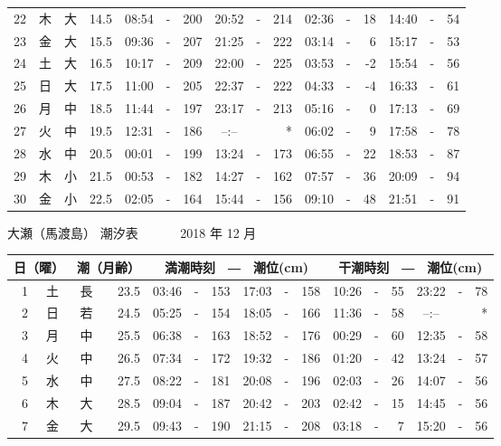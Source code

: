 \documentclass[12pt.a4j]{jsarticle}
\begin{document}
\begin{center}
\begin{table}[ht]
\begin{tabular}{|rc|cr|ccrccr|ccrccr|}
22 & 木 & 大 & 14.5 & 08:54 &-& 200 & 20:52 &-& 214 & 02:36 &-&  18 & 14:40 &-&  54 \\
23 & 金 & 大 & 15.5 & 09:36 &-& 207 & 21:25 &-& 222 & 03:14 &-&   6 & 15:17 &-&  53 \\
24 & 土 & 大 & 16.5 & 10:17 &-& 209 & 22:00 &-& 225 & 03:53 &-&  -2 & 15:54 &-&  56 \\
25 & 日 & 大 & 17.5 & 11:00 &-& 205 & 22:37 &-& 222 & 04:33 &-&  -4 & 16:33 &-&  61 \\
26 & 月 & 中 & 18.5 & 11:44 &-& 197 & 23:17 &-& 213 & 05:16 &-&   0 & 17:13 &-&  69 \\
27 & 火 & 中 & 19.5 & 12:31 &-& 186 & --:-- & &  *  & 06:02 &-&   9 & 17:58 &-&  78 \\
28 & 水 & 中 & 20.5 & 00:01 &-& 199 & 13:24 &-& 173 & 06:55 &-&  22 & 18:53 &-&  87 \\
29 & 木 & 小 & 21.5 & 00:53 &-& 182 & 14:27 &-& 162 & 07:57 &-&  36 & 20:09 &-&  94 \\
30 & 金 & 小 & 22.5 & 02:05 &-& 164 & 15:44 &-& 156 & 09:10 &-&  48 & 21:51 &-&  91 \\
\hline
\end{tabular}
\end{table}
\newpage
{\LARGE 大瀬（馬渡島）  潮汐表　　　}
{\large 2018 年 12 月}\\
\begin{table}[ht]
\begin{tabular}{|rc|cr|ccrccr|ccrccr|}
\hline
\multicolumn{2}{|c|}{日（曜）} & \multicolumn{2}{c|}{潮（月齢）} & \multicolumn{6}{c|}{満潮時刻　―　潮位(cm)} & \multicolumn{6}{c|}{干潮時刻　―　潮位(cm)} \\
\hline
 1 & 土 & 長 & 23.5 & 03:46 &-& 153 & 17:03 &-& 158 & 10:26 &-&  55 & 23:22 &-&  78 \\
 2 & 日 & 若 & 24.5 & 05:25 &-& 154 & 18:05 &-& 166 & 11:36 &-&  58 & --:-- & &  *  \\
 3 & 月 & 中 & 25.5 & 06:38 &-& 163 & 18:52 &-& 176 & 00:29 &-&  60 & 12:35 &-&  58 \\
 4 & 火 & 中 & 26.5 & 07:34 &-& 172 & 19:32 &-& 186 & 01:20 &-&  42 & 13:24 &-&  57 \\
 5 & 水 & 中 & 27.5 & 08:22 &-& 181 & 20:08 &-& 196 & 02:03 &-&  26 & 14:07 &-&  56 \\
 6 & 木 & 大 & 28.5 & 09:04 &-& 187 & 20:42 &-& 203 & 02:42 &-&  15 & 14:45 &-&  56 \\
 7 & 金 & 大 & 29.5 & 09:43 &-& 190 & 21:15 &-& 208 & 03:18 &-&   7 & 15:20 &-&  56 \\

\end{tabular}
\end{table}
\end{center}
\end{document}
